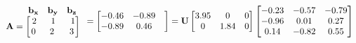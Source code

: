 \documentclass[preview]{standalone}
\begin{document}
\begin{align*}
\begin{array}{ccc}\begin{matrix}\hspace{0.75cm} \mathbf{b_{x}} &  \mathbf{b_{y}} &  \mathbf{b_{z}} \end{matrix} \\ \mathbf{A} = \begin{bmatrix} 2 & \hspace{0.1cm} 1 \hspace{0.1cm}& \hspace{0.1cm} 1 \\ \hspace{0.04cm}  0 \hspace{0.1cm} & \hspace{0.1cm} 2 \hspace{0.1cm}\hspace{0.1cm} & 3 \end{bmatrix} \end{array}= \begin{bmatrix} -0.46 & -0.89 & \\ -0.89 & 0.46 \end{bmatrix}= \mathbf{U} \begin{bmatrix} 3.95 & 0 & 0 \\0 & 1.84 & 0 \end{bmatrix}\begin{bmatrix} -0.23 & -0.57 & -0.79 \\-0.96 & 0.01 & 0.27 \\ 0.14 & -0.82 & 0.55 \end{bmatrix}
\end{align*}
\end{document}
